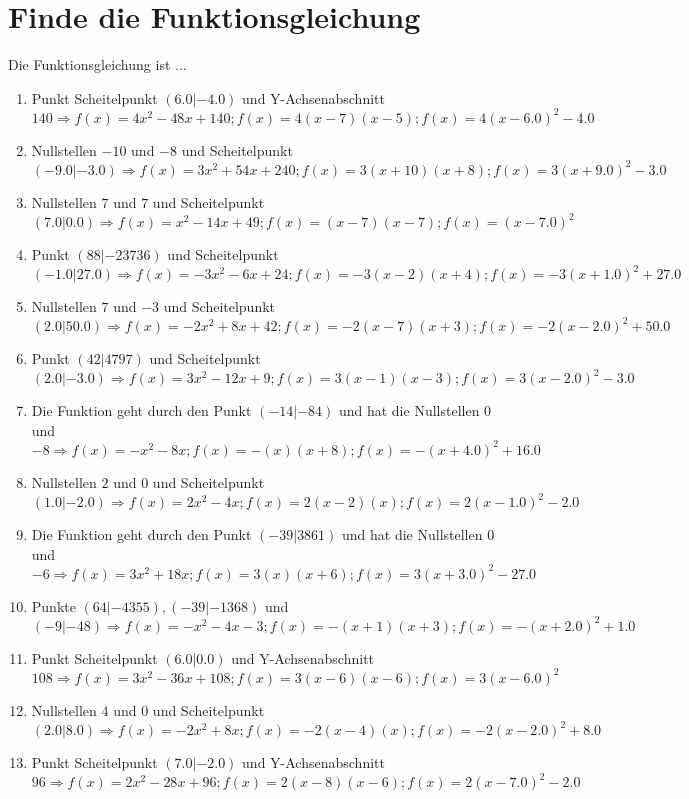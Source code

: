 \documentclass{article}%
\begin{document}
\section{Finde die Funktionsgleichung}%
\label{sec:FindedieFunktionsgleichung}%
Die Funktionsgleichung ist ...%
\begin{enumerate}[label=\alph*)]%
\item%
 Punkt Scheitelpunkt $(6.0|-4.0)$ und Y-Achsenabschnitt $140 \Rightarrow f(x)=4x^2 - 48x + 140 ; f(x)=4(x-7)(x-5) ; f(x)=4(x-6.0)^2 -4.0$%
\item%
 Nullstellen $-10$ und $-8$ und Scheitelpunkt $(-9.0|-3.0) \Rightarrow f(x)=3x^2 + 54x + 240 ; f(x)=3(x+10)(x+8) ; f(x)=3(x+9.0)^2 -3.0$%
\item%
 Nullstellen $7$ und $7$ und Scheitelpunkt $(7.0|0.0) \Rightarrow f(x)=x^2 - 14x + 49 ; f(x)=(x-7)(x-7) ; f(x)=(x-7.0)^2$%
\item%
 Punkt $(88|-23736)$ und Scheitelpunkt $(-1.0|27.0) \Rightarrow f(x)=-3x^2 - 6x + 24 ; f(x)=-3(x-2)(x+4) ; f(x)=-3(x+1.0)^2 +27.0$%
\item%
 Nullstellen $7$ und $-3$ und Scheitelpunkt $(2.0|50.0) \Rightarrow f(x)=-2x^2 + 8x + 42 ; f(x)=-2(x-7)(x+3) ; f(x)=-2(x-2.0)^2 +50.0$%
\item%
 Punkt $(42|4797)$ und Scheitelpunkt $(2.0|-3.0) \Rightarrow f(x)=3x^2 - 12x + 9 ; f(x)=3(x-1)(x-3) ; f(x)=3(x-2.0)^2 -3.0$%
\item%
 Die Funktion geht durch den Punkt $(-14|-84)$ und hat die Nullstellen $0$ und $-8 \Rightarrow f(x)=-x^2 - 8x ; f(x)=-(x)(x+8) ; f(x)=-(x+4.0)^2 +16.0$%
\item%
 Nullstellen $2$ und $0$ und Scheitelpunkt $(1.0|-2.0) \Rightarrow f(x)=2x^2 - 4x ; f(x)=2(x-2)(x) ; f(x)=2(x-1.0)^2 -2.0$%
\item%
 Die Funktion geht durch den Punkt $(-39|3861)$ und hat die Nullstellen $0$ und $-6 \Rightarrow f(x)=3x^2 + 18x ; f(x)=3(x)(x+6) ; f(x)=3(x+3.0)^2 -27.0$%
\item%
 Punkte $(64|-4355),(-39|-1368)$ und $(-9|-48) \Rightarrow f(x)=-x^2 - 4x - 3 ; f(x)=-(x+1)(x+3) ; f(x)=-(x+2.0)^2 +1.0$%
\item%
 Punkt Scheitelpunkt $(6.0|0.0)$ und Y-Achsenabschnitt $108 \Rightarrow f(x)=3x^2 - 36x + 108 ; f(x)=3(x-6)(x-6) ; f(x)=3(x-6.0)^2$%
\item%
 Nullstellen $4$ und $0$ und Scheitelpunkt $(2.0|8.0) \Rightarrow f(x)=-2x^2 + 8x ; f(x)=-2(x-4)(x) ; f(x)=-2(x-2.0)^2 +8.0$%
\item%
 Punkt Scheitelpunkt $(7.0|-2.0)$ und Y-Achsenabschnitt $96 \Rightarrow f(x)=2x^2 - 28x + 96 ; f(x)=2(x-8)(x-6) ; f(x)=2(x-7.0)^2 -2.0$%

\end{enumerate}
\end{document}
